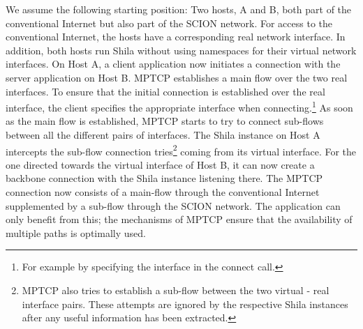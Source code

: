 We assume the following starting position: Two hosts, A and B, both part of the conventional Internet but also part of the SCION network. For access to the conventional Internet, the hosts have a corresponding real network interface.  In addition, both hosts run Shila without using namespaces for their virtual network interfaces. On Host A, a client application now initiates a connection with the server application on Host B. MPTCP establishes a main flow over the two real interfaces. To ensure that the initial connection is established over the real interface, the client specifies the appropriate interface when connecting.\footnote{For example by specifying the interface in the connect call.} As soon as the main flow is established, MPTCP starts to try to connect sub-flows between all the different pairs of interfaces. The Shila instance on Host A intercepts the sub-flow connection tries\footnote{MPTCP also tries to establish a sub-flow between the two virtual - real interface pairs. These attempts are ignored by the respective Shila instances after any useful information has been extracted.} coming from its virtual interface. For the one directed towards the virtual interface of Host B, it can now create a backbone connection with the Shila instance listening there. The MPTCP connection now consists of a  main-flow through the conventional Internet supplemented by a sub-flow through the SCION network. The application can only benefit from this; the mechanisms of MPTCP ensure that the availability of multiple paths is optimally used.  